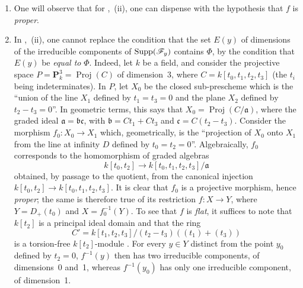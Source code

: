 \begin{remarks}[12.2.3]
\label{IV.12.2.3}
\begin{enumerate}[label=(\roman*)]
  \item One will observe that for ,~(ii), one can dispense with the hypothesis that $f$ is \emph{proper}.

  \item In ,~(ii), one cannot replace the condition that the set $E(y)$ of dimensions of the irreducible components of $\operatorname{Supp}(\mathscr{F}_y)$ contains $\Phi$, by the condition that $E(y)$ be \emph{equal to} $\Phi$.
Indeed, let $k$ be a field, and consider the projective space $P=\mathbf{P}_k^3=\operatorname{Proj}(C)$ of dimension~$3$, where $C=k[t_0,t_1,t_2,t_3]$ (the $t_i$ being indeterminates). In $P$, let $X_0$ be the closed sub-prescheme which is the ``union of the line $X_1$ defined by $t_1=t_3=0$ and the plane $X_2$ defined by $t_2-t_3=0$''. In geometric terms, this says that $X_0=\operatorname{Proj}(C/\mathfrak{a})$, where the graded ideal $\mathfrak{a}=\mathfrak{b}\mathfrak{c}$, with $\mathfrak{b}=Ct_1+Ct_3$ and $\mathfrak{c}=C(t_2-t_3)$. Consider the morphism $f_0:X_0\to X_1$ which, geometrically, is the ``projection of $X_0$ onto $X_1$ from the line at infinity $D$ defined by $t_0=t_2=0$''. Algebraically, $f_0$ corresponds to the homomorphism of graded algebras
\[
  k[t_0,t_2]\longrightarrow k[t_0,t_1,t_2,t_3]/\mathfrak{a}
\]
obtained, by passage to the quotient, from the canonical injection $k[t_0,t_2]\to k[t_0,t_1,t_2,t_3]$.
It is clear that $f_0$ is a projective morphism, hence \emph{proper}; the same is therefore true of its restriction $f:X\to Y$, where $Y=D_+(t_0)$ and $X=f_0^{-1}(Y)$. To see that $f$ is \emph{flat}, it suffices to note that $k[t_2]$ is a principal ideal domain and that the ring
\[
  C'=k[t_1,t_2,t_3]/(t_2-t_3)((t_1)+(t_3))
\]
is a torsion-free $k[t_2]$-module .
For every $y\in Y$ distinct from the point $y_0$ defined by $t_2=0$, $f^{-1}(y)$ then has two irreducible components, of dimensions~0 and~1, whereas $f^{-1}(y_0)$ has only one irreducible component, of dimension~1.


\end{enumerate}
\end{remarks}
